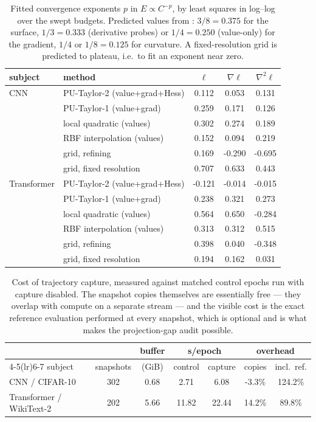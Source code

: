 \begin{table}[t]
\centering
\caption{Fitted convergence exponents $p$ in $E\propto C^{-p}$, by least squares in
log--log over the swept budgets. Predicted values from : $3/8=0.375$
for the surface, $1/3=0.333$ (derivative probes) or $1/4=0.250$ (value-only) for the
gradient, $1/4$ or $1/8=0.125$ for curvature. A fixed-resolution grid is predicted to
plateau, i.e.\ to fit an exponent near zero.}
\label{tab:exponents}
\begin{tabular}{llccc}
\toprule
subject & method & $\ell$ & $\nabla\ell$ & $\nabla^2\ell$ \\
\midrule
CNN & PU-Taylor-2 (value+grad+Hess) & 0.112 & 0.053 & 0.131 \\
 & PU-Taylor-1 (value+grad) & 0.259 & 0.171 & 0.126 \\
 & local quadratic (values) & 0.302 & 0.274 & 0.189 \\
 & RBF interpolation (values) & 0.152 & 0.094 & 0.219 \\
 & grid, refining & 0.169 & -0.290 & -0.695 \\
 & grid, fixed resolution & 0.707 & 0.633 & 0.443 \\
Transformer & PU-Taylor-2 (value+grad+Hess) & -0.121 & -0.014 & -0.015 \\
 & PU-Taylor-1 (value+grad) & 0.238 & 0.321 & 0.273 \\
 & local quadratic (values) & 0.564 & 0.650 & -0.284 \\
 & RBF interpolation (values) & 0.313 & 0.312 & 0.515 \\
 & grid, refining & 0.398 & 0.040 & -0.348 \\
 & grid, fixed resolution & 0.194 & 0.162 & 0.031 \\
\bottomrule
\end{tabular}
\end{table}


\begin{table}[t]
\centering
\caption{Cost of trajectory capture, measured against matched control epochs run with
capture disabled. The snapshot copies themselves are essentially free --- they overlap
with compute on a separate stream --- and the visible cost is the exact reference
evaluation performed at every snapshot, which is optional and is what makes the
projection-gap audit possible.}
\label{tab:overhead}
\small
\begin{tabular}{lcccccc}
\toprule
& & buffer & \multicolumn{2}{c}{s/epoch} & \multicolumn{2}{c}{overhead} \\
\cmidrule(lr){4-5}\cmidrule(lr){6-7}
subject & snapshots & (GiB) & control & capture & copies & incl.\ ref. \\
\midrule
CNN / CIFAR-10 & 302 & 0.68 & 2.71 & 6.08 & -3.3\% & 124.2\% \\
Transformer / WikiText-2 & 202 & 5.66 & 11.82 & 22.44 & 14.2\% & 89.8\% \\
\bottomrule
\end{tabular}
\end{table}
